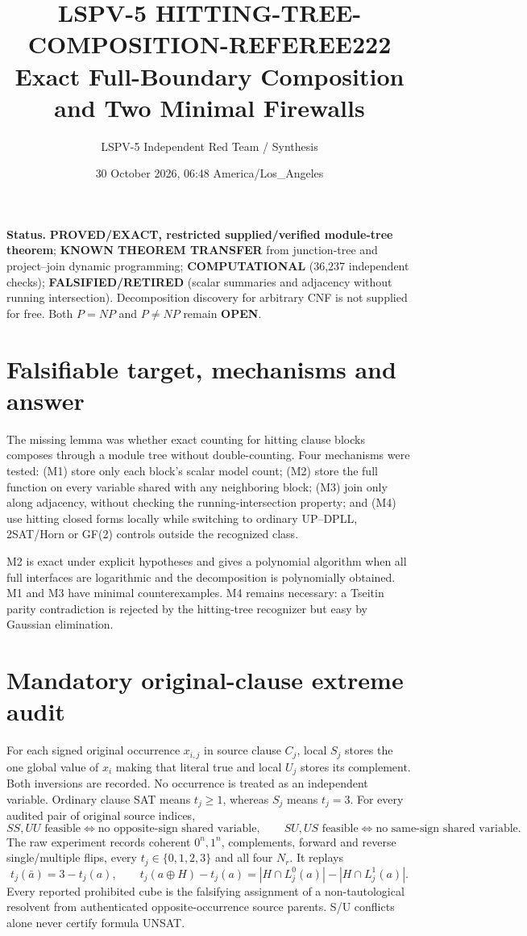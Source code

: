 \documentclass[11pt]{article}
\title{LSPV-5 HITTING-TREE-COMPOSITION-REFEREE222\\
Exact Full-Boundary Composition and Two Minimal Firewalls}
\author{LSPV-5 Independent Red Team / Synthesis}
\date{30 October 2026, 06:48 America/Los\_Angeles}
\begin{document}
\maketitle

\noindent\textbf{Status.} \textbf{PROVED/EXACT, restricted supplied/verified
module-tree theorem}; \textbf{KNOWN THEOREM TRANSFER} from junction-tree and
project--join dynamic programming; \textbf{COMPUTATIONAL} (36,237 independent
checks); \textbf{FALSIFIED/RETIRED} (scalar summaries and adjacency without
running intersection).  Decomposition discovery for arbitrary CNF is not supplied
for free.  Both $P=NP$ and $P\ne NP$ remain \textbf{OPEN}.

\section{Falsifiable target, mechanisms and answer}
The missing lemma was whether exact counting for hitting clause blocks composes
through a module tree without double-counting.  Four mechanisms were tested:
(M1) store only each block's scalar model count; (M2) store the full function on
every variable shared with any neighboring block; (M3) join only along adjacency,
without checking the running-intersection property; and (M4) use hitting closed
forms locally while switching to ordinary UP--DPLL, 2SAT/Horn or GF(2) controls
outside the recognized class.

M2 is exact under explicit hypotheses and gives a polynomial algorithm when all
full interfaces are logarithmic and the decomposition is polynomially obtained.
M1 and M3 have minimal counterexamples.  M4 remains necessary: a Tseitin parity
contradiction is rejected by the hitting-tree recognizer but easy by Gaussian
elimination.

\section{Mandatory original-clause extreme audit}
For each signed original occurrence $x_{i,j}$ in source clause $C_j$, local $S_j$
stores the one global value of $x_i$ making that literal true and local $U_j$
stores its complement.  Both inversions are recorded.  No occurrence is treated
as an independent variable.  Ordinary clause SAT means $t_j\ge1$, whereas $S_j$
means $t_j=3$.  For every audited pair of original source indices,
\[
SS,UU\text{ feasible}\iff\text{no opposite-sign shared variable},\qquad
SU,US\text{ feasible}\iff\text{no same-sign shared variable}.
\]
The raw experiment records coherent $0^n,1^n$, complements, forward and reverse
single/multiple flips, every $t_j\in\{0,1,2,3\}$ and all four $N_r$.  It replays
\[
t_j(\bar a)=3-t_j(a),\qquad
t_j(a\oplus H)-t_j(a)=|H\cap L_j^0(a)|-|H\cap L_j^1(a)|.
\]
Every reported prohibited cube is the falsifying assignment of a non-tautological
resolvent from authenticated opposite-occurrence source parents.  S/U conflicts
alone never certify formula UNSAT.
\end{document}
